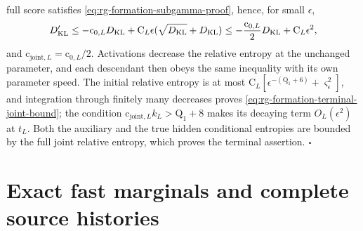 full score satisfies \cref{eq:rg-formation-subgamma-proof}, hence, for small
\(\epsilon\),
\begin{equation}
 D_{\mathrm{KL}}'\le-\mathrm c_{0,L}D_{\mathrm{KL}}+
       \mathrm C_L\epsilon(\sqrt{D_{\mathrm{KL}}}+D_{\mathrm{KL}})
 \le-\frac{\mathrm c_{0,L}}{2}D_{\mathrm{KL}}+\mathrm C_L\epsilon^2,
 \label{eq:rg-formation-joint-moving-reference}
\end{equation}
and \(\mathrm c_{\mathrm{joint},L}=\mathrm c_{0,L}/2\). Activations decrease the
relative entropy at the unchanged parameter, and each descendant then obeys
the same inequality with its own parameter speed. The initial relative entropy
is at most \(\mathrm C_L[\epsilon^{-(\mathrm Q_1+6)}+\varsigma_\epsilon^2]\), and
integration through finitely many decreases proves
\cref{eq:rg-formation-terminal-joint-bound}; the condition
\(\mathrm c_{\mathrm{joint},L}k_L>\mathrm Q_1+8\) makes its decaying term
\(O_L(\epsilon^2)\) at \(t_L\). Both the auxiliary and the true hidden
conditional entropies are bounded by the full joint relative entropy, which
proves the terminal assertion. \hfill\(\square\)

\section{Exact fast marginals and complete source histories}
\label{sec:rg-formation-history-proof}

